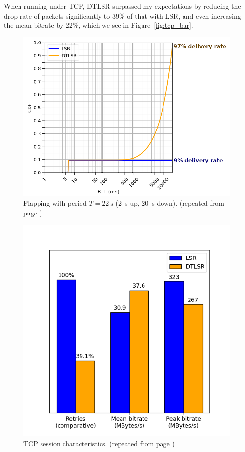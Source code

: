 \documentclass[withindex,glossary,openany]{cam-thesis}
\newcommand{\repeatcaption}[2]{%
  \renewcommand{\thefigure}{\ref{#1}}%
  \captionsetup{list=no}%
  \caption{#2 (repeated from page \pageref{#1})}%
  \addtocounter{figure}{-1}%
}
\begin{document}
When running under TCP, DTLSR surpassed my expectations by reducing the drop rate of packets significantly to 39\% of that with LSR, and even increasing the mean bitrate by 22\%, which we see in Figure~\ref{fig:tcp_bar}.

\begin{minipage}{1\textwidth}

\begin{figure}[H]
  \centering
  \hspace*{2.4cm}
  \includegraphics[width=0.8\linewidth]{delay_partition_flap2_20}
  \repeatcaption{fig:partition_2_20}{Flapping with period $T=\SI{22}{\s}$ (\SI{2}{\s} up, \SI{20}{\s} down).}
\end{figure}

\vspace{-10mm} 

\begin{figure}[H]
  \centering
  \includegraphics[width=0.65\linewidth]{tcp_bar_flap2}
  \repeatcaption{fig:tcp_bar}{TCP session characteristics.}
\end{figure}

\end{minipage}
\end{document}
